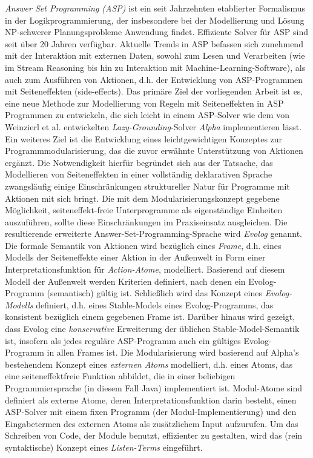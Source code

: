 \documentclass[draft,final]{vutinfth} %
\theoremstyle{definition}
\begin{document}
\begin{kurzfassung}
  \emph{Answer Set Programming (ASP)} ist ein seit Jahrzehnten etablierter Formalismus in der Logikprogrammierung, der insbesondere bei der Modellierung und Lösung NP-schwerer Planungsprobleme Anwendung findet. Effiziente Solver für ASP sind seit über 20 Jahren verfügbar. Aktuelle Trends in ASP befassen sich zunehmend mit der Interaktion mit externen Daten, sowohl zum Lesen und Verarbeiten (wie im Stream Reasoning bis hin zu Interaktion mit Machine-Learning-Software), als auch zum Ausführen von Aktionen, d.h. der Entwicklung von ASP-Programmen mit Seiteneffekten (side-effects). Das primäre Ziel der vorliegenden Arbeit ist es, eine neue Methode zur Modellierung von Regeln mit Seiteneffekten in ASP Programmen zu entwickeln, die sich leicht in einem ASP-Solver wie dem von Weinzierl et al. entwickelten \emph{Lazy-Grounding}-Solver \emph{Alpha} implementieren lässt. Ein weiteres Ziel ist die Entwicklung eines leichtgewichtigen Konzeptes zur Programmmodularisierung, das die zuvor erwähnte Unterstützung von Aktionen ergänzt. Die Notwendigkeit hierfür begründet sich aus der Tatsache, das Modellieren von Seiteneffekten in einer vollständig deklarativen Sprache zwangsläufig einige Einschränkungen struktureller Natur für Programme mit Aktionen mit sich bringt. Die mit dem Modularisierungskonzept gegebene Möglichkeit, seiteneffekt-freie Unterprogramme als eigenständige Einheiten auszuführen, sollte diese Einschränkungen im Praxiseinsatz ausgleichen. Die resultierende erweiterte Answer-Set-Programming-Sprache wird \emph{Evolog} genannt.
  Die formale Semantik von Aktionen wird bezüglich eines \emph{Frame}, d.h. eines Modells der Seiteneffekte einer Aktion in der Außenwelt in Form einer Interpretationsfunktion für \emph{Action-Atome}, modelliert. Basierend auf diesem Modell der Außenwelt werden Kriterien definiert, nach denen ein Evolog-Programm (semantisch) gültig ist. Schließlich wird das Konzept eines \emph{Evolog-Modells} definiert, d.h. eines Stable-Models eines Evolog-Programms, das konsistent bezüglich einem gegebenen Frame ist. Darüber hinaus wird gezeigt, dass Evolog eine \emph{konservative} Erweiterung der üblichen Stable-Model-Semantik ist, insofern als jedes reguläre ASP-Programm auch ein gültiges Evolog-Programm in allen Frames ist.
  Die Modularisierung wird basierend auf Alpha's bestehendem Konzept eines \emph{externen Atoms} modelliert, d.h. eines Atoms, das eine seiteneffektfreie Funktion abbildet, die in einer beliebigen Programmiersprache (in diesem Fall Java) implementiert ist. Modul-Atome sind definiert als externe Atome, deren Interpretationsfunktion darin besteht, einen ASP-Solver mit einem fixen Programm (der Modul-Implementierung) und den Eingabetermen des externen Atoms als zusätzlichem Input aufzurufen. Um das Schreiben von Code, der Module benutzt, effizienter zu gestalten, wird das (rein syntaktische) Konzept eines \emph{Listen-Terms} eingeführt.

\end{kurzfassung}
\end{document}
